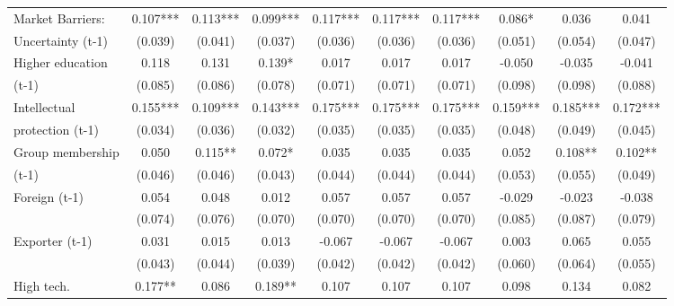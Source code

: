 \begin{table}[htbp]
\begin{tabular}{l*{9}{c}}
Market Barriers:    &       0.107***&       0.113***&       0.099***&       0.117***&       0.117***&       0.117***&       0.086*  &       0.036   &       0.041   \\
Uncertainty (t-1)   &     (0.039)   &     (0.041)   &     (0.037)   &     (0.036)   &     (0.036)   &     (0.036)   &     (0.051)   &     (0.054)   &     (0.047)   \\
Higher education    &       0.118   &       0.131   &       0.139*  &       0.017   &       0.017   &       0.017   &      -0.050   &      -0.035   &      -0.041   \\
(t-1)               &     (0.085)   &     (0.086)   &     (0.078)   &     (0.071)   &     (0.071)   &     (0.071)   &     (0.098)   &     (0.098)   &     (0.088)   \\
Intellectual        &       0.155***&       0.109***&       0.143***&       0.175***&       0.175***&       0.175***&       0.159***&       0.185***&       0.172***\\
protection (t-1)    &     (0.034)   &     (0.036)   &     (0.032)   &     (0.035)   &     (0.035)   &     (0.035)   &     (0.048)   &     (0.049)   &     (0.045)   \\
Group membership    &       0.050   &       0.115** &       0.072*  &       0.035   &       0.035   &       0.035   &       0.052   &       0.108** &       0.102** \\
(t-1)               &     (0.046)   &     (0.046)   &     (0.043)   &     (0.044)   &     (0.044)   &     (0.044)   &     (0.053)   &     (0.055)   &     (0.049)   \\
Foreign (t-1)       &       0.054   &       0.048   &       0.012   &       0.057   &       0.057   &       0.057   &      -0.029   &      -0.023   &      -0.038   \\
                    &     (0.074)   &     (0.076)   &     (0.070)   &     (0.070)   &     (0.070)   &     (0.070)   &     (0.085)   &     (0.087)   &     (0.079)   \\
Exporter (t-1)      &       0.031   &       0.015   &       0.013   &      -0.067   &      -0.067   &      -0.067   &       0.003   &       0.065   &       0.055   \\
                    &     (0.043)   &     (0.044)   &     (0.039)   &     (0.042)   &     (0.042)   &     (0.042)   &     (0.060)   &     (0.064)   &     (0.055)   \\
High tech.          &       0.177** &       0.086   &       0.189** &       0.107   &       0.107   &       0.107   &       0.098   &       0.134   &       0.082   \\

\end{tabular}
\end{table}
